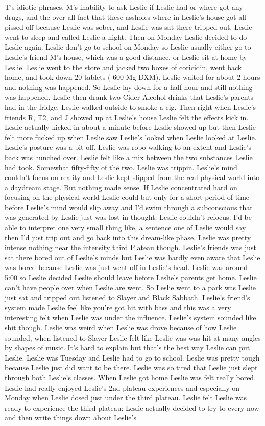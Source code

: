 \documentclass[12pt]{book}
\begin{document}
T's idiotic phrases, M's inability to ask Leslie if Leslie had or where got any drugs, and the over-all fact that these assholes where in Leslie's house got all pissed off because Leslie was sober, and Leslie was sat there tripped out. Leslie went to sleep and called Leslie a night. Then on Monday Leslie decided to do Leslie again. Leslie don't go to school on Monday so Leslie usually either go to Leslie's friend M's house, which was a good distance, or Leslie sit at home by Leslie. Leslie went to the store and jacked two boxes of coricidin, went back home, and took down 20 tablets ( 600 Mg-DXM). Leslie waited for about 2 hours and nothing was happened. So Leslie lay down for a half hour and still nothing was happened. Leslie then drank two Cider Alcohol drinks that Leslie's parents had in the fridge. Leslie walked outside to smoke a cig. Then right when Leslie's friends R, T2, and J showed up at Leslie's house Leslie felt the effects kick in. Leslie actually kicked in about a minute before Leslie showed up but then Leslie felt more fucked up when Leslie saw Leslie's looked when Leslie looked at Leslie. Leslie's posture was a bit off. Leslie was robo-walking to an extent and Leslie's back was hunched over. Leslie felt like a mix between the two substances Leslie had took. Somewhat fifty-fifty of the two. Leslie was trippin. Leslie's mind couldn't focus on reality and Leslie kept slipped from the real physical world into a daydream stage. But nothing made sense. If Leslie concentrated hard on focusing on the physical world Leslie could but only for a short period of time before Leslie's mind would slip away and I'd swim through a subconscious that was generated by Leslie just was lost in thought. Leslie couldn't refocus. I'd be able to interpret one very small thing like, a sentence one of Leslie would say then I'd just trip out and go back into this dream-like phase. Leslie was pretty intense nothing near the intensity third Plateau though. Leslie's friends was just sat there bored out of Leslie's minds but Leslie was hardly even aware that Leslie was bored because Leslie was just went off in Leslie's head. Leslie was around 5:00 so Leslie decided Leslie should leave before Leslie's parents get home. Leslie can't have people over when Leslie are went. So Leslie went to a park was Leslie just sat and tripped out listened to Slayer and Black Sabbath. Leslie's friend's system made Leslie feel like you're got hit with bass and this was a very interesting felt when Leslie was under the influence. Leslie's system sounded like shit though. Leslie was weird when Leslie was drove because of how Leslie sounded, when listened to Slayer Leslie felt like Leslie was was hit at many angles by shapes of music. It's hard to explain but that's the best way Leslie can put Leslie. Leslie was Tuesday and Leslie had to go to school. Leslie was pretty tough because Leslie just did want to be there. Leslie was so tired that Leslie just slept through both Leslie's classes. When Leslie got home Leslie was felt really bored. Leslie had really enjoyed Leslie's 2nd plateau experiences and especially on Monday when Leslie dosed just under the third plateau. Leslie felt Leslie was ready to experience the third plateau: Leslie actually decided to try to every now and then write things down about Leslie's 
\end{document}
